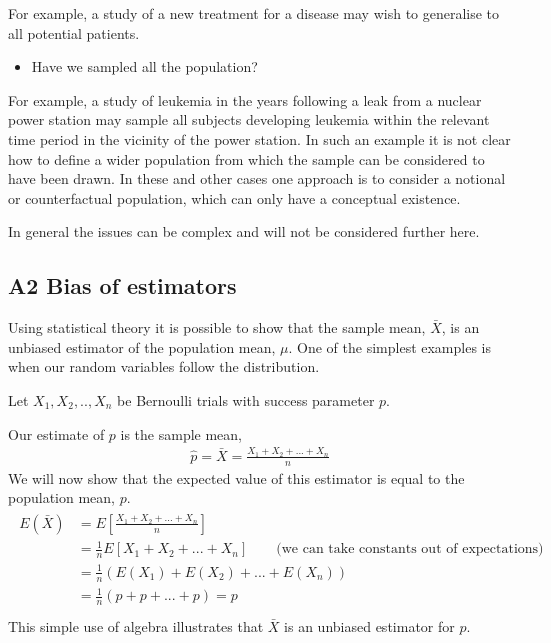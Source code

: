 \documentclass[letterpaper,10pt,english]{jupyterBook}
\begin{document}
\sphinxAtStartPar
For example, a study of a new treatment for a disease may wish to generalise to all potential patients.
\begin{itemize}
\item {} 
\sphinxAtStartPar
Have we sampled all the population?

\end{itemize}

\sphinxAtStartPar
For example, a study of leukemia in the years following a leak from a nuclear power station may sample all subjects developing leukemia within the relevant time period in the vicinity of the power station. In such an example it is not clear how to define a wider population from which the sample can be considered to have been drawn. In these and other cases one approach is to consider a notional or counterfactual population, which can only have a conceptual existence.

\sphinxAtStartPar
In general the issues can be complex and will not be considered further here.


\subsection{A2 Bias of estimators}
\label{\detokenize{04.g. Population.and.samples:a2-bias-of-estimators}}
\sphinxAtStartPar
Using statistical theory it is possible to show that the sample mean, \(\bar{X}\), is an unbiased estimator of the population mean, \(\mu\). One of the simplest examples is when our random variables follow the  distribution.

\sphinxAtStartPar
{} Let \(X_1, X_2,.., X_n\) be Bernoulli trials with success parameter \(p\).

\sphinxAtStartPar
Our estimate of \(p\) is the sample mean,
\begin{equation*}
\begin{split}
\hat{p} = \bar{X} = \frac{X_1 + X_2 + ... + X_n}{n}
\end{split}
\end{equation*}
\sphinxAtStartPar
We will now show that the expected value of this estimator is equal to the population mean, \(p\).
\begin{equation*}
\begin{split}
\begin{align*}
E(\bar{X}) & = E\left[\frac{X_1 + X_2 + ... + X_n}{n}\right] \\
& = \frac{1}{n} E[X_1 + X_2 + ... + X_n] \qquad  \mbox{(we can take constants out of expectations)} \\
&= \frac{1}{n} (E(X_1) + E(X_2) + ... + E(X_n)) \\
&= \frac{1}{n} (p + p + ... + p) = p \\
\end{align*}
\end{split}
\end{equation*}
\sphinxAtStartPar
This simple use of algebra illustrates that \(\bar{X}\) is an unbiased estimator for \(p\).
\end{document}

